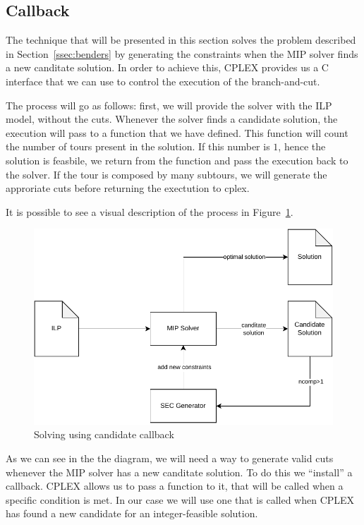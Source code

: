 \documentclass{article}
\begin{document}
\subsection{Callback}
The technique that will be presented in this section solves the problem
described in Section~\ref{ssec:benders} by generating the constraints when
the MIP solver finds a new canditate solution. In order to achieve this,
CPLEX provides us a C interface that we can use to control the execution
of the branch-and-cut.

The process will go as follows: first, we will provide the solver with the
ILP model, without the cuts. Whenever the solver finds a candidate solution,
the execution will pass to a function that we have defined. This function
will count the number of tours present in the solution. If this number is $1$,
hence the solution is feasbile, we return from the function and pass the
execution back to the solver. If the tour is composed by many subtours,
we will generate the approriate cuts before returning the exectution to
cplex.

It is possible to see a visual description of the process in
Figure~\ref{fig:callback}.

\begin{figure}[ht]
        \caption{Solving using candidate callback}
        \label{fig:callback}
        \centering
        \includegraphics[width=340pt]{assets/callback.drawio.pdf}
\end{figure}

As we can see in the the diagram, we will need a way to generate valid cuts
whenever the MIP solver has a new canditate solution. To do this we ``install''
a callback. CPLEX allows us to pass a function to it, that will be called when
a specific condition is met. In our case we will use one that is called when CPLEX
has found a new candidate for an integer-feasible solution.
\end{document}
